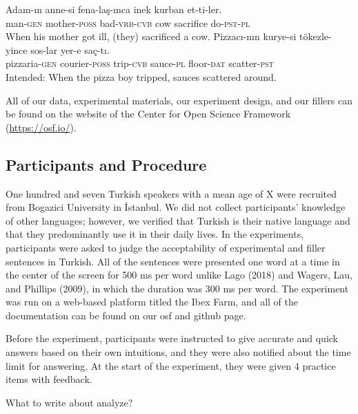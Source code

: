 \documentclass[doc]{apa6}
\begin{document}
\begin{exe}
\ex
\begin{xlist}
\ex \label{fillera}
\gll Adam-{\i}n anne-si fena-la\c{s}-{\i}nca inek kurban et-ti-ler.\\
man-\textsc{gen} mother-\textsc{poss} bad-\textsc{vrb}-\textsc{cvb} cow sacrifice do-\textsc{pst}-\textsc{pl}\\
\glt When his mother got ill, (they) sacrificed a cow.
\ex \label{fillerb}
\gll *Pizzac{\i}-n{\i}n kurye-si t\"{o}kezle-yince sos-lar yer-e sa\c{c}-t{\i}.\\
pizzaria-\textsc{gen} courier-\textsc{poss} trip-\textsc{cvb} sauce-\textsc{pl} floor-\textsc{dat} scatter-\textsc{pst}\\
\glt Intended: When the pizza boy tripped, sauces scattered around. 
\end{xlist}
\end{exe}

All of our data, experimental materials, our experiment design, and our
fillers can be found on the website of the Center for Open Science
Framework (\url{https://osf.io/}).

\subsection{Participants and
Procedure}\label{participants-and-procedure}

One hundred and seven Turkish speakers with a mean age of X were
recruited from Bogazici University in İstanbul. We did not collect
participants' knowledge of other languages; however, we verified that
Turkish is their native language and that they predominantly use it in
their daily lives. In the experiments, participants were asked to judge
the acceptability of experimental and filler sentences in Turkish. All
of the sentences were presented one word at a time in the center of the
screen for 500 ms per word unlike Lago (2018) and Wagers, Lau, and
Phillips (2009), in which the duration was 300 ms per word. The
experiment was run on a web-based platform titled the Ibex Farm, and all
of the documentation can be found on our osf and github page.

Before the experiment, participants were instructed to give accurate and
quick answers based on their own intuitions, and they were also notified
about the time limit for answering. At the start of the experiment, they
were given 4 practice items with feedback.

What to write about analyze?
\end{document}
